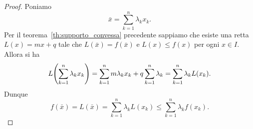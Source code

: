   \begin{proof}
  Poniamo 
  \[
    \bar x =  \sum_{k=1}^n \lambda_k x_k.
  \]
  Per il teorema~\ref{th:supporto_convessa} precedente 
  sappiamo che esiste una retta $L(x) = mx + q$ 
  tale che $L(\bar x) = f(\bar x)$ 
  e $L(x)\le f(x)$ per ogni $x \in I$.
  Allora si ha 
  \[
  L {\left( \sum_{k=1}^n \lambda_k x_k \right)}
  = \sum_{k=1}^n m \lambda_k x_k + q \sum_{k=1}^n \lambda_k 
  = \sum_{k=1}^n \lambda_k L(x_k).  
  \]
  Dunque 
  \[
  f(\bar x) = L(\bar x) = \sum_{k=1}^n \lambda_k L(x_k) \le 
  \sum_{k=1}^n \lambda_k f(x_k).
  \]
  \end{proof}

